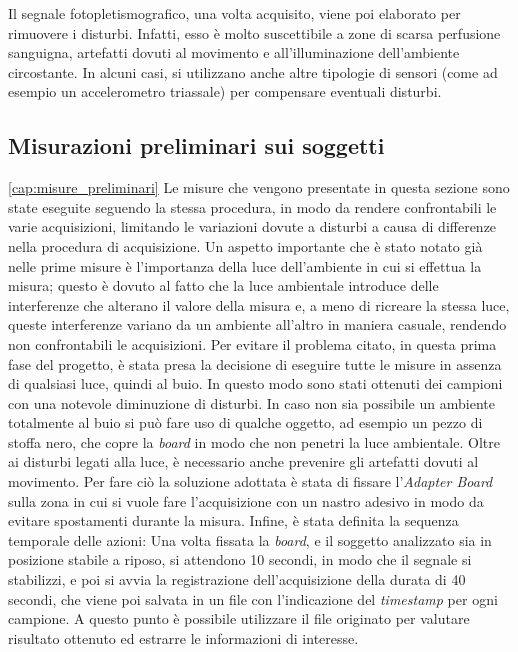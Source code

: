 Il segnale fotopletismografico, una volta acquisito, viene poi elaborato per rimuovere i disturbi. Infatti, esso è molto suscettibile a zone di scarsa perfusione sanguigna, artefatti dovuti al movimento e all'illuminazione dell'ambiente circostante. In alcuni casi, si utilizzano anche altre tipologie di sensori (come ad esempio un accelerometro triassale) per compensare eventuali disturbi.

\subsection{Misurazioni preliminari sui soggetti}\ref{cap:misure_preliminari}
Le misure che vengono presentate in questa sezione sono state eseguite seguendo la stessa procedura, in modo da rendere confrontabili le varie acquisizioni, limitando le variazioni dovute a disturbi a causa di differenze nella procedura di acquisizione. Un aspetto importante che è stato notato già nelle prime misure è l'importanza della luce dell'ambiente in cui si effettua la misura; questo è dovuto al fatto che la luce ambientale introduce delle interferenze che alterano il valore della misura e, a meno di ricreare la stessa luce, queste interferenze variano da un ambiente all'altro in maniera casuale, rendendo non confrontabili le acquisizioni. Per evitare il problema citato, in questa prima fase del progetto, è stata presa la decisione di eseguire tutte le misure in assenza di qualsiasi luce, quindi al buio. In questo modo sono stati ottenuti dei campioni con una notevole diminuzione di disturbi. In caso non sia possibile un ambiente totalmente al buio si può fare uso di qualche oggetto, ad esempio un pezzo di stoffa nero, che copre la \textit{board} in modo che non penetri la luce ambientale.
Oltre ai disturbi legati alla luce, è necessario anche prevenire gli artefatti dovuti al movimento. Per fare ciò la soluzione adottata è stata di fissare l'\textit{Adapter Board} sulla zona in cui si vuole fare l'acquisizione con un nastro adesivo in modo da evitare spostamenti durante la misura.
Infine, è stata definita la sequenza temporale delle azioni: Una volta fissata la \textit{board}, e il soggetto analizzato sia in posizione stabile a riposo, si attendono 10 secondi, in modo che il segnale si stabilizzi, e poi si avvia la registrazione dell'acquisizione della durata di 40 secondi, che viene poi salvata in un file con l'indicazione del \textit{timestamp} per ogni campione. A questo punto è possibile utilizzare il file originato per valutare risultato ottenuto ed estrarre le informazioni di interesse.


